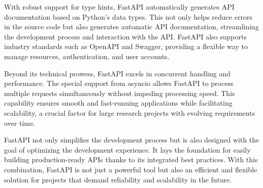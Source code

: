 With robust support for type hints, FastAPI automatically generates API documentation based on Python's data types. This not only helps reduce errors in the source code but also generates automatic API documentation, streamlining the development process and interaction with the API. FastAPI also supports industry standards such as OpenAPI and Swagger, providing a flexible way to manage resources, authentication, and user accounts.

Beyond its technical prowess, FastAPI excels in concurrent handling and performance. The special support from asyncio allows FastAPI to process multiple requests simultaneously without impeding processing speed. This capability ensures smooth and fast-running applications while facilitating scalability, a crucial factor for large research projects with evolving requirements over time.

FastAPI not only simplifies the development process but is also designed with the goal of optimizing the development experience. It lays the foundation for easily building production-ready APIs thanks to its integrated best practices. With this combination, FastAPI is not just a powerful tool but also an efficient and flexible solution for projects that demand reliability and scalability in the future.